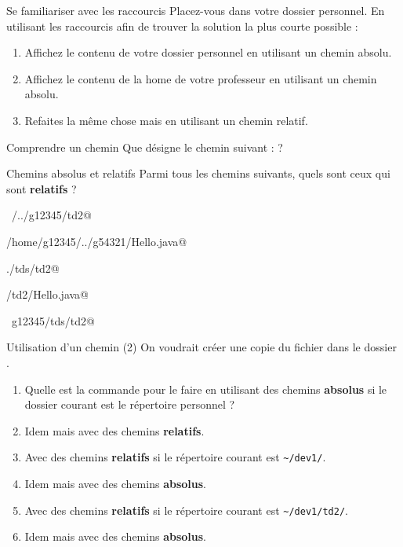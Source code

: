 \documentclass[a4paper,11pt]{style-esi/td}
\begin{document}
		\begin{Exercice}{Se familiariser avec les raccourcis}
			Placez-vous dans votre dossier personnel.
			En utilisant les raccourcis 
			afin de trouver la solution la plus courte possible :
			\begin{enumerate}
			\item Affichez le contenu de votre dossier personnel
				en utilisant un chemin absolu.
			\item Affichez le contenu de la home de votre professeur
				en utilisant un chemin absolu.
			\item Refaites la même chose mais en utilisant un chemin relatif.
			\end{enumerate}
		\end{Exercice}

		\begin{Exercice}{Comprendre un chemin}
			Que désigne le chemin suivant :
			 ?
		\end{Exercice}

		\begin{Exercice}{Chemins absolus et relatifs}
			Parmi tous les chemins suivants, quels sont ceux qui sont 
			\textbf{relatifs} ?			
			\begin{selectmany} 
			\item \verb@~/../g12345/td2@
			\item \verb@/home/g12345/../g54321/Hello.java@
			\item \verb@./tds/td2@
			\item \verb@tds/td2/Hello.java@
			\item \verb@~g12345/tds/td2@
			\end{selectmany} 
        \end{Exercice}

		\begin{Exercice}{Utilisation d'un chemin (2)}
			On voudrait créer une copie du fichier 
			dans le dossier .
			\begin{enumerate}
			\item 
				Quelle est la commande pour le faire en utilisant
				des chemins \textbf{absolus} si le dossier courant
				est le répertoire personnel ?
				\textbox{2em}
			\item 
				Idem mais avec des chemins \textbf{relatifs}.
				\textbox{2em}
			\item 
				Avec des chemins \textbf{relatifs}
				si le répertoire courant est \verb|~/dev1/|.
				\textbox{2em}
			\item 
				Idem mais avec des chemins \textbf{absolus}.
				\textbox{2em}
			\item 
				Avec des chemins \textbf{relatifs}
				si le répertoire courant est \verb|~/dev1/td2/|.
				\textbox{2em}
			\item 
				Idem mais avec des chemins \textbf{absolus}.
				\textbox{2em}
		\end{enumerate}
		\end{Exercice}
\end{document}
